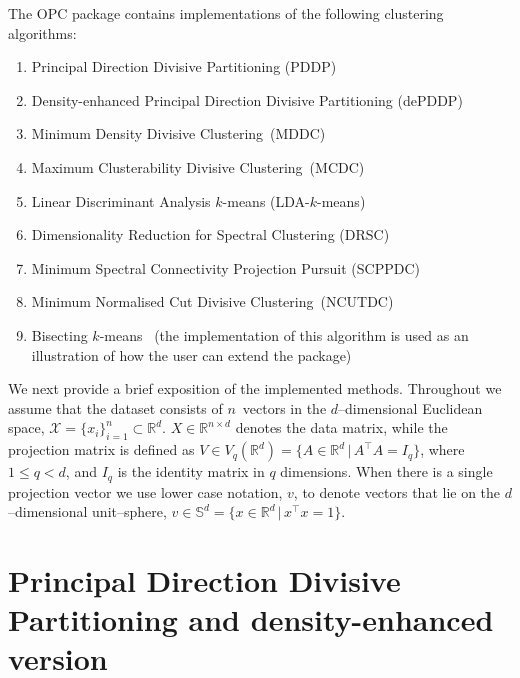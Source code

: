 \documentclass{book}
\def\R{\mathbb{R}}
\begin{document}
The OPC package contains implementations of the following clustering
algorithms:

\begin{enumerate}

\item Principal Direction Divisive Partitioning (PDDP)~\cite{Boley1998}

\item Density-enhanced Principal Direction Divisive Partitioning (dePDDP)~\cite{TasoulisTP2010}

\item Minimum Density Divisive Clustering~(MDDC)~\cite{PavlidisHT2016}

\item Maximum Clusterability Divisive Clustering~(MCDC)~\cite{HofmeyrP2015}

\item Linear Discriminant Analysis $k$-means (LDA-$k$-means)~\cite{DingL2007}

\item Dimensionality Reduction for Spectral Clustering (DRSC)~\cite{NiuDJ2011,NiuDJ2014}

\item Minimum Spectral Connectivity Projection Pursuit (SCPPDC)~\cite{HofmeyrPE2018}

\item Minimum Normalised Cut Divisive Clustering~(NCUTDC)~\cite{Hofmeyr2017}

\item Bisecting $k$-means~\cite{SteinbachKK2000} (the implementation of this
algorithm is used as an illustration of how the user can extend the package)

\end{enumerate}


\noindent
%
We next provide a brief exposition of the implemented methods.
Throughout we assume that the
dataset consists of $n$~vectors in the $d$--dimensional Euclidean space,
$\mathcal{X} = \{x_i\}_{i=1}^n \subset \R^d$.
%
$X \in \R^{n \times d}$ denotes the data matrix, while 
%
the projection matrix is defined as
%
$V \in V_q(\R^d) = \{A \in \R^d \,|\, A^\top A = I_q\}$, where 
$1\leqslant q<d$, and $I_q$ is the identity matrix in $q$ dimensions.
%
When there is a single projection vector we use lower case notation, $v$,
to denote vectors that lie on the $d$--dimensional unit--sphere,
$v \in \mathbb{S}^{d} = \{ x \in \R^d \,|\, x^\top x=1\}$.


\section{Principal Direction Divisive Partitioning and density-enhanced version}
\end{document}
